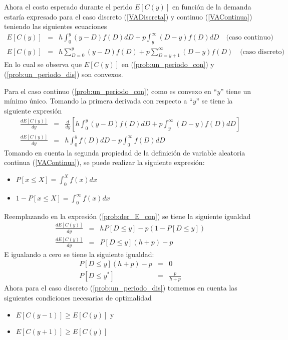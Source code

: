 Ahora el costo esperado durante el perido $E[C(y)]$ en función de la demanda estaría expresado para el caso discreto (\ref{VADiscreta}) y continuo (\ref{VAContinua}) teniendo las siguientes ecuaciones
\begin{eqnarray}
	\label{prob:un_periodo_con}
	E[C(y)] &=& h \int_{0}^{y} (y-D)f(D)dD + p \int_{y}^{\infty} (D-y)f(D)dD \quad \text{(caso continuo)} \\
	\label{prob:un_periodo_dis}
	E[C(y)] &=& h \sum\limits_{D = 0}^{y}(y-D)f(D) + p \sum\limits_{D = y+1}^{\infty} (D-y)f(D) \quad \text{(caso discreto)}
\end{eqnarray}
En lo cual se observa que $E[C(y)]$ en (\ref{prob:un_periodo_con}) y (\ref{prob:un_periodo_dis}) son convexos.

Para el caso continuo (\ref{prob:un_periodo_con}) como es convexo en ``$y$'' tiene un mínimo único. Tomando la primera derivada con respecto a ``$y$'' se tiene la siguiente expresión
\begin{eqnarray}
	\label{prob:der_E_con}
	\frac{d E[C(y)]}{dy} &=& \frac{d}{dy} \left[ h \int_{0}^{y} (y-D)f(D)dD + p \int_{y}^{\infty} (D-y)f(D)dD \right] \nonumber \\
	\frac{d E[C(y)]}{dy} &=& h \int_{0}^{y} f(D)dD - p \int_{0}^{\infty} f(D) dD
\end{eqnarray} 
Tomando en cuenta la segunda propiedad de la definición de variable aleatoria continua (\ref{VAContinua}), se puede realizar la siguiente expresión:
\begin{itemize}
 	\item $P[x \leq X] = \int_{0}^{X} f(x)dx$ 
 	\item $1 - P[x \leq X] = \int_{0}^{\infty} f(x)dx$
\end{itemize} 
Reemplazando en la expresión (\ref{prob:der_E_con}) se tiene la siguiente igualdad
\begin{eqnarray}
	\frac{d E[C(y)]}{dy} &=& hP[D \leq y] - p(1 - P[D \leq y]) \nonumber \\
	\frac{d E[C(y)]}{dy} &=& P[D \leq y] (h + p) - p \nonumber
\end{eqnarray}
E igualando a cero se tiene la siguiente igualdad:
\begin{eqnarray}
	\label{prob:P_D_men_y_opt}
	P[D \leq y] (h + p) - p &=& 0 \nonumber \\
	P[D \leq y^*] &=& \frac{p}{h+p}
\end{eqnarray}
Ahora para el caso discreto (\ref{prob:un_periodo_dis}) tomemos en cuenta las siguientes condiciones necesarias de optimalidad
\begin{itemize}
	\item $E[C(y-1)] \geq E[C(y)]$ y
	\item $E[C(y+1)] \geq E[C(y)]$ 
\end{itemize}
